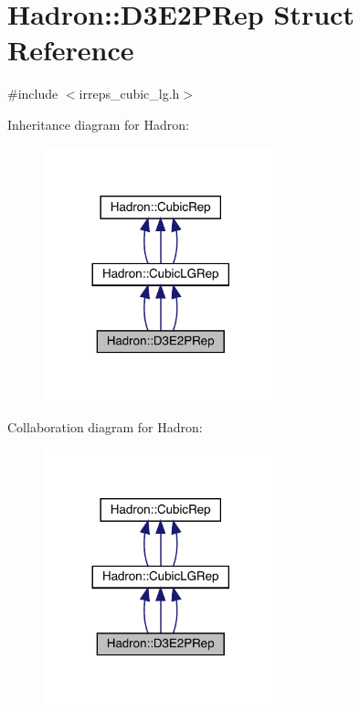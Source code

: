 \hypertarget{structHadron_1_1D3E2PRep}{}\section{Hadron\+:\+:D3\+E2\+P\+Rep Struct Reference}
\label{structHadron_1_1D3E2PRep}


{\ttfamily \#include $<$irreps\+\_\+cubic\+\_\+lg.\+h$>$}



Inheritance diagram for Hadron\+:
\nopagebreak
\begin{figure}[H]
\begin{center}
\leavevmode
\includegraphics[width=192pt]{d5/d67/structHadron_1_1D3E2PRep__inherit__graph}
\end{center}
\end{figure}


Collaboration diagram for Hadron\+:
\nopagebreak
\begin{figure}[H]
\begin{center}
\leavevmode
\includegraphics[width=192pt]{d0/df2/structHadron_1_1D3E2PRep__coll__graph}
\end{center}
\end{figure}
